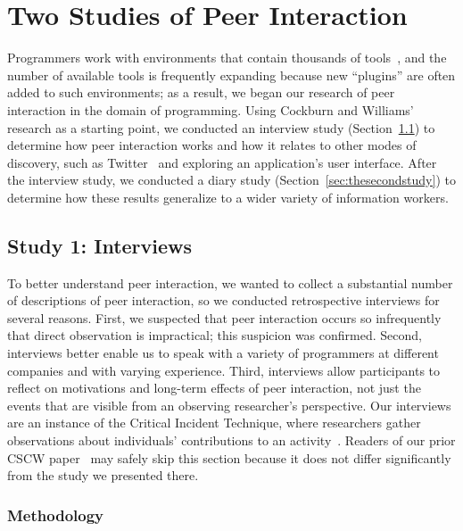 \documentclass[smallextended]{svjour3}
\newcommand\discovery{peer interaction\xspace}
\newcommand\DisCovery{Peer Interaction\xspace}
\begin{document}
\section{Two Studies of \DisCovery}\label{sec:practice}

\noindent
Programmers work with environments that contain thousands
of tools~\citep{murphyHill12c}, and the number of available tools is frequently expanding 
because new ``plugins'' are often added to such environments;
as a result, we began our research of \discovery in the domain of programming.
Using Cockburn and Williams' research as a starting point, we conducted 
an interview study (Section~\ref{sec:thefirststudy})
to determine how \discovery works and how it relates to other
modes of discovery, such as Twitter~\citeyearpar{twitter} and exploring an application's user
interface. 
After the interview study, we conducted a diary study 
(Section~\ref{sec:thesecondstudy})
to determine how these results generalize
to a wider variety of information workers.

\subsection{Study 1: Interviews}\label{sec:thefirststudy}

\noindent
To better understand \discovery, we wanted to collect a substantial number of
descriptions of \discovery, so
we conducted retrospective interviews
for several reasons.
First, we suspected that \discovery occurs so infrequently that
direct observation is impractical; this suspicion was confirmed.
Second, interviews better enable us to speak with a variety of programmers at
different companies and with varying experience.
Third, interviews allow participants to reflect on motivations and long-term
effects of \discovery, not just the events that are visible from an
observing researcher's perspective.
Our interviews are an instance of the Critical Incident Technique, where
researchers gather observations about individuals' contributions to 
an activity~\citep{flanagan1954critical}. 
Readers of our prior CSCW paper~\citep{murphy-hill11:peer} may safely skip
this section because it does not differ significantly from the study we presented
there.

\subsubsection{Methodology}
\end{document}
